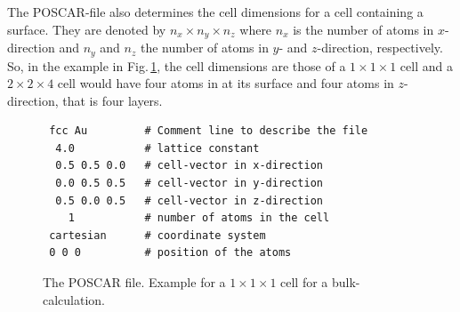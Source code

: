 \documentclass[twoside, 11pt, titlepage, captions=nooneline, a4paper, headsepline]{scrbook}%
\begin{document}
The POSCAR-file also determines the cell dimensions for a cell containing a surface. They are denoted by $n_x\times n_y\times n_z$ where $n_x$ is the number of atoms in $x$-direction and $n_y$ and $n_z$ the number of atoms in $y$- and $z$-direction, respectively. So, in the example in Fig.\,\ref{POSCARfile}, the cell dimensions are those of a $1\times1\times1$ cell and a $2\times2\times4$ cell would have four atoms in at its surface and four atoms in $z$-direction, that is four layers.
\begin{figure}[t!]
\begin{verbatim}
 fcc Au         # Comment line to describe the file
  4.0           # lattice constant
  0.5 0.5 0.0   # cell-vector in x-direction
  0.0 0.5 0.5   # cell-vector in y-direction 
  0.5 0.0 0.5   # cell-vector in z-direction
    1           # number of atoms in the cell
 cartesian      # coordinate system 
 0 0 0          # position of the atoms
\end{verbatim}
\caption{\label{POSCARfile}The POSCAR file. Example for a $1\times1\times1$ cell for a bulk-calculation.}
\end{figure}
\end{document}
